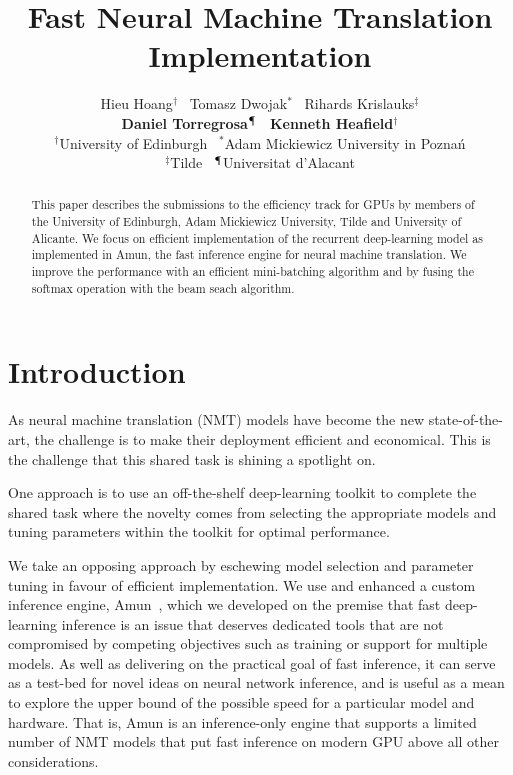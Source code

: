 \documentclass[11pt,a4paper]{article}
\title{Fast Neural Machine Translation Implementation}
\author{Hieu Hoang$^{\dagger}$ \, Tomasz Dwojak$^{*}$ \, Rihards Krislauks$^{\ddagger}$ \\ {\bf Daniel Torregrosa$^{\mathparagraph}$ \, Kenneth Heafield$^{\dagger}$ } \\[2mm]
  $^{\dagger}$University of Edinburgh \, $^{*}$Adam Mickiewicz University in Pozna\'{n} \\ $^{\ddagger}$Tilde \,  $^{\mathparagraph}$Universitat d'Alacant }
\date{}
\begin{document}
\maketitle
\begin{abstract}

This paper describes the submissions to the efficiency track for GPUs by members of the University of Edinburgh, Adam Mickiewicz University, Tilde and University of Alicante. We focus on efficient implementation of the recurrent deep-learning model as implemented in Amun, the fast inference engine for neural machine translation. We improve the performance with an efficient mini-batching algorithm and by fusing the softmax operation with the beam seach algorithm.


\end{abstract}

\section{Introduction}
\label{sec:Introduction}

As neural machine translation (NMT) models have become the new state-of-the-art, the challenge is to make their deployment efficient and economical. This is the challenge that this shared task is shining a spotlight on.

One approach is to use an off-the-shelf deep-learning toolkit to complete the shared task where the novelty comes from selecting the appropriate models and tuning parameters within the toolkit for optimal performance. %

We take an opposing approach by eschewing model selection and parameter tuning in favour of efficient implementation. We use and enhanced a custom inference engine, Amun~\citep{junczys2016neural}, which we developed on the premise that fast deep-learning inference is an issue that deserves dedicated tools that are not compromised by competing objectives such as training or support for multiple models. As well as delivering on the practical goal of fast inference, it can serve as a test-bed for novel ideas on neural network inference, and is useful as a mean to explore the upper bound of the possible speed for a particular model and hardware. That is, Amun is an inference-only engine that supports a limited number of NMT models that put fast inference on modern GPU above all other considerations. %
\end{document}
